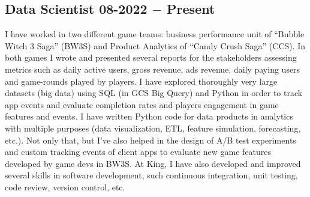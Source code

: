 \subsection{{Data Scientist \hfill 08-2022 $-$ Present}}
\begin{zitemize}
\item 
I have worked in two different game teams: business performance unit of ``Bubble Witch 3 Saga'' (BW3S) and Product Analytics of ``Candy Crush Saga'' (CCS). 
In both games I wrote and presented several reports for the stakeholders assessing metrics such as 
daily active users, gross revenue, ads revenue, daily paying users and game-rounds played by players. 
I have explored thoroughly very large datasets (big data) using SQL (in GCS Big Query) and Python 
in order to track app events and evaluate completion rates and players engagement in game features and events.
I have written Python code for data products in analytics with multiple purposes (data visualization, ETL, feature simulation, forecasting, etc.).
Not only that, but I've also helped in the design of A/B test experiments and custom tracking events of client apps to evaluate new game features developed by game devs in BW3S.  
At King, I have also developed and improved several skills in software development, such continuous integration, unit testing, code review, version control, etc.
\end{zitemize}

